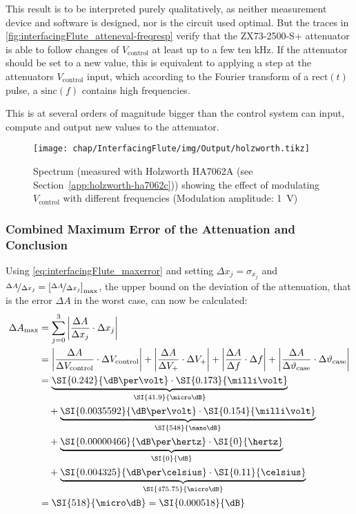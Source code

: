 This result is to be interpreted purely qualitatively, as neither measurement device and software is designed, nor is the circuit used optimal.
But the traces in \autoref{fig:interfacingFlute_atteneval-freqresp} verify that the ZX73-2500-S+ attenuator is able to follow changes of $V_\text{control}$ at least up to a few ten \si{\kHz}. If the attenuator should be set to a new value, this is equivalent to applying a step at the attenuators $V_\text{control}$ input, which according to the Fourier transform of a $\text{rect}(t)$ pulse, a $\text{sinc}(f)$ contains high frequencies.

This is at several orders of magnitude bigger than the control system can input, compute and output new values to the attenuator.

\begin{figure}[H]
	\centering
	\texttt{[image: chap/InterfacingFlute/img/Output/holzworth.tikz]}
	\caption[Spectrum showing maximum modulation speed]{Spectrum (measured with Holzworth HA7062A (see Section~\ref{app:holzworth-ha7062c})) showing the effect of modulating $V_\text{control}$ with different frequencies (Modulation amplitude: \SI{1}{\volt})}
	\label{fig:interfacingFlute_atteneval-freqresp}
\end{figure}

\newpage
\subsubsection{Combined Maximum Error of the Attenuation and Conclusion}
Using \autoref{eq:interfacingFlute_maxerror} and setting $\Delta x_j = \sigma_{x_j}$ and $\nicefrac{\Delta A}{\Delta x_j} = \left[\nicefrac{\Delta A}{\Delta x_j}\right]_\text{max}$, the upper bound on the deviation of the attenuation, that is the error $\Delta A$ in the worst case, can now be calculated:
\begin{align}
\Delta A_{\text{max}} &= \sum_{j=0}^{3} \left|\frac{\Delta A}{\Delta x_j} \cdot \Delta x_j\right|\\
                      &= \left|\frac{\Delta A}{\Delta V_\text{control}} \cdot \Delta V_\text{control}\right|
                      +  \left|\frac{\Delta A}{\Delta V_{+}} \cdot \Delta V_{+}\right|
                      +  \left|\frac{\Delta A}{\Delta f} \cdot \Delta f\right|
                      +  \left|\frac{\Delta A}{\Delta \vartheta_\text{case}} \cdot \Delta \vartheta_\text{case}\right|\\
                      &=       \underbrace{\SI{0.242}{\dB\per\volt} \cdot \SI{0.173}{\milli\volt}}_{\SI{41.9}{\micro\dB\relax}}\\
                      &\quad+  \underbrace{\SI{0.0035592}{\dB\per\volt} \cdot \SI{0.154}{\milli\volt}}_{\SI{548}{\nano\dB\relax}}\\
                      &\quad+  \underbrace{\SI{0.00000466}{\dB\per\hertz} \cdot \SI{0}{\hertz}}_{\SI{0}{\dB\relax}}\\
                      &\quad+  \underbrace{\SI{0.004325}{\dB\per\celsius} \cdot \SI{0.11}{\celsius}}_{\SI{475.75}{\micro\dB\relax}}\\
                      &= \SI{518}{\micro\dB\relax} = \SI{0.000518}{\dB}
\end{align}

